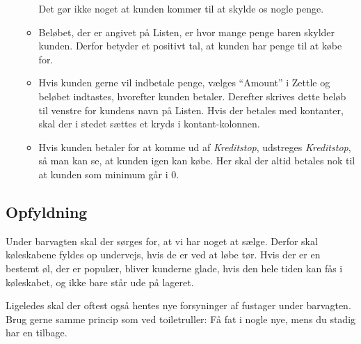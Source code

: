 \begin{itemize}
\begin{itemize}
        Det gør ikke noget at kunden kommer til at skylde os nogle penge.
        \item Beløbet, der er angivet på Listen, er hvor mange penge baren skylder kunden.
        Derfor betyder et positivt tal, at kunden har penge til at købe for.
        \item Hvis kunden gerne vil indbetale penge, vælges ``Amount'' i Zettle og beløbet indtastes, hvorefter kunden betaler.
        Derefter skrives dette beløb til venstre for kundens navn på Listen.
        Hvis der betales med kontanter, skal der i stedet sættes et kryds i kontant-kolonnen.
        \item Hvis kunden betaler for at komme ud af \emph{Kreditstop},
        udstreges \emph{Kreditstop}, så man kan se, at kunden igen kan
        købe. Her skal der altid betales nok til at kunden som minimum går i 0.
    \end{itemize}
\end{itemize}

\subsection{Opfyldning}
\label{sec:intra:opfyldning}

Under barvagten skal der sørges for, at vi har noget at sælge. Derfor skal
køleskabene fyldes op undervejs, hvis de er ved at løbe tør. Hvis der
er en bestemt øl, der er populær, bliver kunderne glade, hvis den hele
tiden kan fås i køleskabet, og ikke bare står ude på lageret.

Ligeledes skal der oftest også hentes nye forsyninger af fustager
under barvagten. Brug gerne samme princip som ved toiletruller: Få fat
i nogle nye, mens du stadig har en tilbage.

